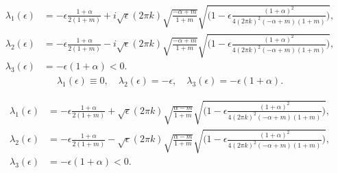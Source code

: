 \documentclass[a4paper,11pt]{article}
\theoremstyle{remark}
\begin{document}
\begin{align*}
 \lambda_1(\epsilon) &= - \epsilon\frac{1+\alpha}{2(1+m)} + i\sqrt{\epsilon}(2\pi k)\sqrt{\frac{-\alpha+m}{1+m}}\sqrt{\Big(1-\epsilon \frac{(1+\alpha)^2}{4(2\pi k)^2(-\alpha+m)(1+m)}\Big)},\\ 
 \lambda_2(\epsilon) &= - \epsilon\frac{1+\alpha}{2(1+m)} - i\sqrt{\epsilon}(2\pi k)\sqrt{\frac{-\alpha+m}{1+m}}\sqrt{\Big(1-\epsilon \frac{(1+\alpha)^2}{4(2\pi k)^2(-\alpha+m)(1+m)}\Big)},\\ 
 \lambda_3(\epsilon) &= -\epsilon(1+\alpha)<0. 
\end{align*}
\begin{align*}
 \lambda_1(\epsilon)\equiv 0, \quad \lambda_2(\epsilon)= -\epsilon, \quad \lambda_3(\epsilon) = -\epsilon(1+\alpha).
\end{align*}

\begin{align*}
 \lambda_1(\epsilon) &= - \epsilon\frac{1+\alpha}{2(1+m)} + \sqrt{\epsilon}(2\pi k)\sqrt{\frac{\alpha-m}{1+m}}\sqrt{\Big(1-\epsilon \frac{(1+\alpha)^2}{4(2\pi k)^2(-\alpha+m)(1+m)}\Big)},\\ 
 \lambda_2(\epsilon) &= - \epsilon\frac{1+\alpha}{2(1+m)} - \sqrt{\epsilon}(2\pi k)\sqrt{\frac{\alpha-m}{1+m}}\sqrt{\Big(1-\epsilon \frac{(1+\alpha)^2}{4(2\pi k)^2(-\alpha+m)(1+m)}\Big)},\\ 
 \lambda_3(\epsilon) &= -\epsilon(1+\alpha)<0. 
\end{align*}
\end{document}
